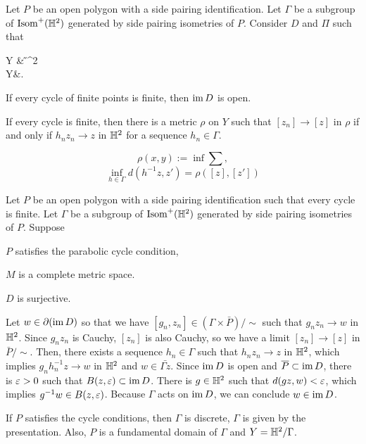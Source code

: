 \documentclass[12pt]{article}
\begin{document}
\begin{prb}
Let $P$ be an open polygon with a side pairing identification.
Let $\Gamma$ be a subgroup of $\operatorname{Isom}^+(\mathbb{H}^2)$ generated by side pairing isometries of $P$.
Consider $D$ and $\Pi$ such that
\begin{cd}
\tilde Y\dar{\Pi} & \H^2\\
Y&.
\end{cd}
\begin{parts}
\item If every cycle of finite points is finite, then $\operatorname{im} D$ is open.
\item If every cycle is finite, then there is a metric $\rho$ on $Y$ such that $[z_n]\to[z]$ in $\rho$ if and only if $h_nz_n\to z$ in $\mathbb{H}^2$ for a sequence $h_n\in\Gamma$.
\end{parts}
\end{prb}
\begin{pf}
\[\rho(x,y):=\inf\sum,\]
\[\inf_{h\in\Gamma}d(h^{-1}z,z')=\rho([z],[z'])\]
\end{pf}

\begin{prb}
Let $P$ be an open polygon with a side pairing identification such that every cycle is finite.
Let $\Gamma$ be a subgroup of $\operatorname{Isom}^+(\mathbb{H}^2)$ generated by side pairing isometries of $P$.
Suppose 
\begin{parts}
\item $P$ satisfies the parabolic cycle condition,
\item $M$ is a complete metric space.
\item $D$ is surjective.
\end{parts}
\end{prb}
\begin{pf}
Let $w\in\partial(\operatorname{im} D)$ so that we have $[g_n,z_n]\in(\Gamma\times\bar P)/\sim$ such that $g_nz_n\to w$ in $\mathbb{H}^2$.
Since $g_nz_n$ is Cauchy, $[z_n]$ is also Cauchy, so we have a limit $[z_n]\to[z]$ in $\bar P/\sim$.
Then, there exists a sequence $h_n\in\Gamma$ such that $h_nz_n\to z$ in $\mathbb{H}^2$, which implies $g_nh_n^{-1}z\to w$ in $\mathbb{H}^2$ and $w\in\bar{\Gamma z}$.
Since $\operatorname{im} D$ is open and $\overline P\subset\operatorname{im} D$, there is $\varepsilon>0$ such that $B(z,\varepsilon)\subset\operatorname{im} D$.
There is $g\in\mathbb{H}^2$ such that $d(gz,w)<\varepsilon$, which implies $g^{-1}w\in B(z,\varepsilon)$.
Because $\Gamma$ acts on $\operatorname{im} D$, we can conclude $w\in\operatorname{im} D$.
\end{pf}

If $P$ satisfies the cycle conditions, then $\Gamma$ is discrete, $\Gamma$ is given by the presentation.
Also, $P$ is a fundamental domain of $\Gamma$ and $Y=\mathbb{H}^2/\Gamma$.
\end{document}
